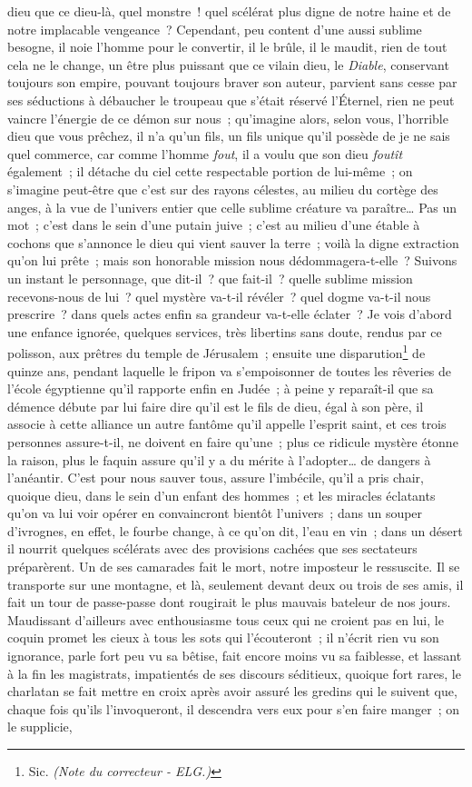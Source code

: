 \documentclass[french,twoside]{book} %
\begin{document}
dieu que ce dieu-là, quel monstre ! quel scélérat plus digne de notre haine et de notre implacable vengeance ? Cependant, peu content d’une aussi sublime besogne, il noie l’homme pour le convertir, il le brûle, il le maudit, rien de tout cela ne le change, un être plus puissant que ce vilain dieu, le {\itshape Diable}, conservant toujours son empire, pouvant toujours braver son auteur, parvient sans cesse par ses séductions à débaucher le troupeau que s’était réservé l’Éternel, rien ne peut vaincre l’énergie de ce démon sur nous ; qu’imagine alors, selon vous, l’horrible dieu que vous prêchez, il n’a qu’un fils, un fils unique qu’il possède de je ne sais quel commerce, car comme l’homme {\itshape fout}, il a voulu que son dieu {\itshape foutît} également ; il détache du ciel cette respectable portion de lui-même ; on s’imagine peut-être que c’est sur des rayons célestes, au milieu du cortège des anges, à la vue de l’univers entier que celle sublime créature va paraître… Pas un mot ; c’est dans le sein d’une putain juive ; c’est au milieu d’une étable à cochons que s’annonce le dieu qui vient sauver la terre ; voilà la digne extraction qu’on lui prête ; mais son honorable mission nous dédommagera-t-elle ? Suivons un instant le personnage, que dit-il ? que fait-il ? quelle sublime mission recevons-nous de lui ? quel mystère va-t-il révéler ? quel dogme va-t-il nous prescrire ? dans quels actes enfin sa grandeur va-t-elle éclater ? Je vois d’abord une enfance ignorée, quelques services, très libertins sans doute, rendus par ce polisson, aux prêtres du temple de Jérusalem ; ensuite une disparution\footnote{ Sic. {\itshape (Note du correcteur - ELG.)}} de quinze ans, pendant laquelle le fripon va s’empoisonner de toutes les rêveries de l’école égyptienne qu’il rapporte enfin en Judée ; à peine y reparaît-il que sa démence débute par lui faire dire qu’il est le fils de dieu, égal à son père, il associe à cette alliance un autre fantôme qu’il appelle l’esprit saint, et ces trois personnes assure-t-il, ne doivent en faire qu’une ; plus ce ridicule mystère étonne la raison, plus le faquin assure qu’il y a du mérite à l’adopter… de dangers à l’anéantir. C’est pour nous sauver tous, assure l’imbécile, qu’il a pris chair, quoique dieu, dans le sein d’un enfant des hommes ; et les miracles éclatants qu’on va lui voir opérer en convaincront bientôt l’univers ; dans un souper d’ivrognes, en effet, le fourbe change, à ce qu’on dit, l’eau en vin ; dans un désert il nourrit quelques scélérats avec des provisions cachées que ses sectateurs préparèrent. Un de ses camarades fait le mort, notre imposteur le ressuscite. Il se transporte sur une montagne, et là, seulement devant deux ou trois de ses amis, il fait un tour de passe-passe dont rougirait le plus mauvais bateleur de nos jours. Maudissant d’ailleurs avec enthousiasme tous ceux qui ne croient pas en lui, le coquin promet les cieux à tous les sots qui l’écouteront ; il n’écrit rien vu son ignorance, parle fort peu vu sa bêtise, fait encore moins vu sa faiblesse, et lassant à la fin les magistrats, impatientés de ses discours séditieux, quoique fort rares, le charlatan se fait mettre en croix après avoir assuré les gredins qui le suivent que, chaque fois qu’ils l’invoqueront, il descendra vers eux pour s’en faire manger ; on le supplicie, 
\end{document}
